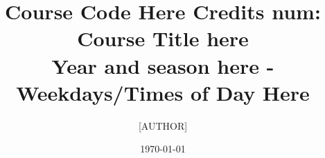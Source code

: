 


\newcommand{\myAuthor}              {[AUTHOR]} %
\newcommand{\mySubject}             {PDF Subject Here}  %
\newcommand{\myKeywords}            {PDF Keywords Here} %
\newcommand{\myCourseDateCreated}   {Created Date Here}
\newcommand{\myCourseDateUpdated}   {\today}
\newcommand{\myCourseCredits}       {Credits num}
\newcommand{\myCourseCode}          {Course Code Here}
\newcommand{\myCourseTitle}         {Course Title here}
\newcommand{\myCourseProf}          {Course Prof Here}    %
\newcommand{\myCourseSemester}      {Year and season here} %
\newcommand{\myCourseSchedule}      {Weekdays/Times of Day Here} %
\newcommand{\myCourseSection}       {Section Here} %
\newcommand{\myCourseLocation}      {Course Location}
\newcommand{\myTitle}{\myCourseCode{} \myCourseCredits{}: \myCourseTitle{} \\ \myCourseSemester{} - \myCourseSchedule{}}

\newcommand{\comment}[1]{}                          %
\newcommand{\image}[1]{[\textbf{IMAGE MISSING #1}]} %
\newenvironment{itemize*}{\begin{itemize}\setlength{\itemsep}{0pt}\setlength{\parskip}{0pt}}{\end{itemize}} %
\newenvironment{enumerate*}{\begin{enumerate}\setlength{\itemsep}{0pt}\setlength{\parskip}{0pt}}{\end{enumerate}} %
\newenvironment{enumalph*}{\begin{enumerate}[label=\alph*.]\setlength{\itemsep}{0pt}\setlength{\parskip}{0pt}}{\end{enumerate}} %

\documentclass{article}
\title{\myTitle}
\author{\myAuthor}
\date{\myCourseDateUpdated}

